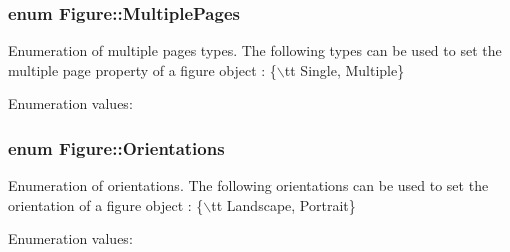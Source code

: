 \subsubsection{\setlength{\rightskip}{0pt plus 5cm}enum Figure::Multiple\-Pages}\label{classFigure_s27}


Enumeration of multiple pages types. The following types can be used to set the multiple page property of a figure object : \{$\backslash$tt Single, Multiple\} \begin{Desc}
\item[Enumeration values: ]\par
\begin{description}
\item[{\em 
{\em Single}\label{classFigure_s27s21}
}]\item[{\em 
{\em Multiple}\label{classFigure_s27s22}
}]\end{description}
\end{Desc}

\subsubsection{\setlength{\rightskip}{0pt plus 5cm}enum Figure::Orientations}\label{classFigure_s23}


Enumeration of orientations. The following orientations can be used to set the orientation of a figure object : \{$\backslash$tt Landscape, Portrait\} \begin{Desc}
\item[Enumeration values: ]\par
\begin{description}
\item[{\em 
{\em Landscape}\label{classFigure_s23s0}
}]\item[{\em 
{\em Portrait}\label{classFigure_s23s1}
}]\end{description}
\end{Desc}

